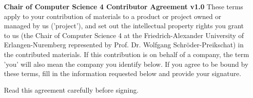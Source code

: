 \documentclass[12pt, a4paper]{article}
\begin{document}
\textbf{\large{Chair of Computer Science 4 Contributor Agreement
    v1.0}} \newline\newline These terms apply to your contribution of
materials to a product or project owned or managed by us ('project'),
and set out the intellectual property rights you grant to us (the
Chair of Computer Science 4 at the Friedrich-­Alexander University of
Erlangen­-Nuremberg represented by Prof. Dr. Wolfgang Schröder-Preikschat) in
the contributed materials. If this contribution is on behalf of a
company, the term 'you' will also mean the company you identify
below. If you agree to be bound by these terms, fill in the
information requested below and provide your signature.

Read this agreement carefully before signing.
\end{document}
